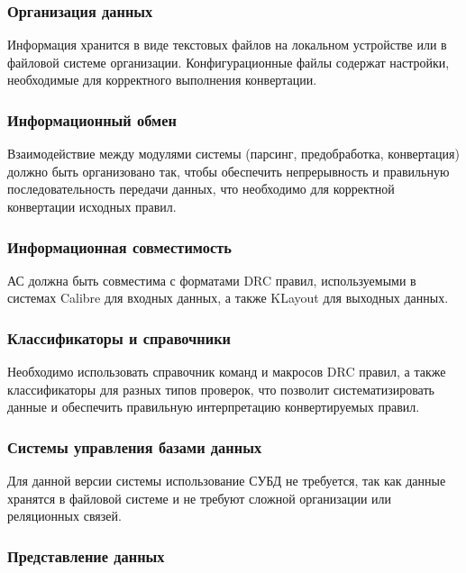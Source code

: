 \subsubsection{Организация данных}

Информация хранится в виде текстовых файлов на локальном устройстве
или в файловой системе организации.
Конфигурационные файлы содержат настройки,
необходимые для корректного выполнения конвертации.

\subsubsection{Информационный обмен}

Взаимодействие между модулями системы (парсинг, предобработка, конвертация)
должно быть организовано так, чтобы обеспечить непрерывность
и правильную последовательность передачи данных,
что необходимо для корректной конвертации исходных правил.

\subsubsection{Информационная совместимость}

АС должна быть совместима с форматами DRC правил,
используемыми в системах Calibre для входных данных,
а также KLayout для выходных данных.

\subsubsection{Классификаторы и справочники}

Необходимо использовать справочник команд и макросов DRC правил,
а также классификаторы для разных типов проверок,
что позволит систематизировать данные
и обеспечить правильную интерпретацию конвертируемых правил.

\subsubsection{Системы управления базами данных}

Для данной версии системы использование СУБД не требуется,
так как данные хранятся в файловой системе
и не требуют сложной организации или реляционных связей.

\subsubsection{Представление данных}

